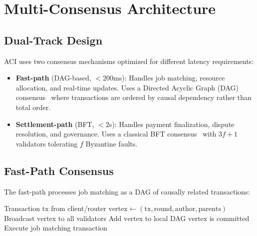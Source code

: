 \section{Multi-Consensus Architecture}

\label{sec:consensus}

\subsection{Dual-Track Design}

ACI uses two consensus mechanisms optimized for different latency requirements:

\begin{definition}
\begin{itemize}[leftmargin=1.1em]
    \item \textbf{Fast-path} (DAG-based, $< 200$ms): Handles job matching, resource allocation, and real-time updates. Uses a Directed Acyclic Graph (DAG) consensus~\cite{danezis2022narwhal} where transactions are ordered by causal dependency rather than total order.
    \item \textbf{Settlement-path} (BFT, $< 2$s): Handles payment finalization, dispute resolution, and governance. Uses a classical BFT consensus~\cite{yin2019hotstuff} with $3f+1$ validators tolerating $f$ Byzantine faults.
\end{itemize}
\end{definition}

\subsection{Fast-Path Consensus}

The fast-path processes job matching as a DAG of causally related transactions:

\begin{algorithm}[H]
\caption{Fast-Path DAG Consensus}
\label{alg:fastpath}
\begin{algorithmic}[1]
\Require Transaction $\text{tx}$ from client/router
\State $\text{vertex} \gets (\text{tx}, \text{round}, \text{author}, \text{parents})$
\State Broadcast $\text{vertex}$ to all validators
\State {}
\State Add $\text{vertex}$ to local DAG
\State {}
    \State $\text{vertex}$ is committed
    \State Execute job matching transaction
\EndIf
\end{algorithmic}
\end{algorithm}

